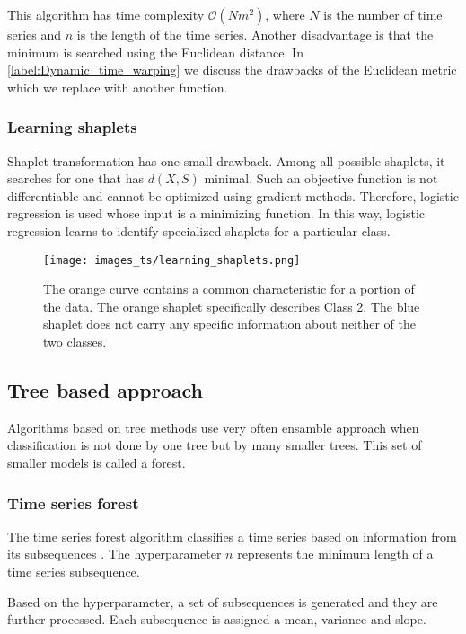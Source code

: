 \documentclass[thesis=M,english]{FITthesis}[2019/12/23]
\begin{document}
This algorithm has time complexity $\mathcal{O}(Nm^2)$, where $N$ is the number of time series and $n$ is the length of the time series. Another disadvantage is that the minimum is searched using the Euclidean distance. In \ref{label:Dynamic_time_warping} we discuss the drawbacks of the Euclidean metric which we replace with another function.

\subsubsection{Learning shaplets}

Shaplet transformation has one small drawback. Among all possible shaplets, it searches for one that has $d(X,S)$ minimal. Such an objective function is not differentiable and cannot be optimized using gradient methods. Therefore, logistic regression is used whose input is a minimizing function. In this way, logistic regression learns to identify specialized shaplets for a particular class.

\begin{figure}[ht!]
    \texttt{[image: images\_ts/learning\_shaplets.png]}
    \caption{The orange curve contains a common characteristic for a portion of the data. The orange shaplet specifically describes Class 2. The blue shaplet does not carry any specific information about neither of the two classes.\cite{learning_shaplet_img} }
    \label{fig:shaplet_picture_learinng}
    \centering
\end{figure}

\newpage
\subsection{Tree based approach}
Algorithms based on tree methods use very often ensamble approach when classification is not done by one tree but by many smaller trees. This set of smaller models is called a forest.
\subsubsection{Time series forest}
The time series forest algorithm classifies a time series based on information from its subsequences \cite{timeseries_forest}. The hyperparameter $n$ represents the minimum length of a time series subsequence.

Based on the hyperparameter, a set of subsequences is generated and they are further processed. Each subsequence is assigned a mean, variance and slope.
\end{document}

